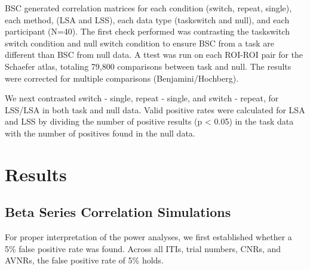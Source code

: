 \documentclass[10pt,letterpaper]{article}
\begin{document}
BSC generated correlation matrices for each condition (switch, repeat, single),
each method, (LSA and LSS), each data type (taskswitch and null), and each participant (N=40).
The first check performed was contrasting the taskswitch switch condition and null switch condition
to ensure BSC from a task are different than BSC from null data.
A ttest was run on each ROI-ROI pair for the Schaefer atlas, totaling 79,800 comparisons
between task and null.
The results were corrected for multiple comparisons (Benjamini/Hochberg).

We next contrasted switch - single, repeat - single, and switch - repeat, for LSS/LSA in both
task and null data.
Valid positive rates were calculated for LSA and LSS by dividing the number of positive results (p < 0.05)
in the task data with the number of positives found in the null data.



\section*{Results}
\label{results}

\subsection*{Beta Series Correlation Simulations}
\label{results:bsc-simulations}

For proper interpretation of the power analyses, we first established whether
a 5\% false positive rate was found.
Across all ITIs, trial numbers, CNRs, and AVNRs, the false positive rate of 5\%
holds.
\end{document}
